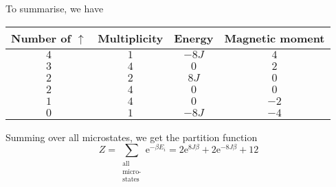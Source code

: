 \documentclass[12pt,english,a4paper]{article}
\renewcommand{\exp}[1]{\mathrm{e}^{#1}}
\begin{document}
To summarise, we have
\begin{table}[H]
    \centering
    \begin{tabular}{cccc}\toprule
        Number of \(\uparrow\) & Multiplicity & Energy & Magnetic moment\\ \midrule
        \(4\) & \(1\) & \(-8J\) & \(4\) \\ \midrule
        \(3\) & \(4\) & \(0\) & \(2\) \\ \midrule
        \(2\) & \(2\) & \(8J\) & \(0\) \\ \midrule
        \(2\) & \(4\) & \(0\) & \(0\) \\ \midrule
        \(1\) & \(4\) & \(0\) & \(-2\) \\ \midrule
        \(0\) & \(1\) & \(-8J\) & \(-4\) \\ \bottomrule
    \end{tabular}
\end{table}

Summing over all microstates, we get the partition function
\[
    Z = \sum_{\substack{\text{all}\\ \text{micro-}\\ \text{states}}} \exp{-\beta E_i}
    = 2\exp{8J\beta} + 2\exp{-8J\beta} + 12
\]
\end{document}
